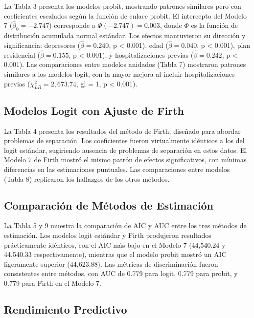 \documentclass[
  spanish,
  10pt,
]{article}
\begin{document}
La Tabla 3 presenta los modelos probit, mostrando patrones similares
pero con coeficientes escalados según la función de enlace probit. El
intercepto del Modelo 7 (\(\hat{\beta}_0 = -2.747\)) corresponde a
\(\Phi(-2.747) = 0.003\), donde \(\Phi\) es la función de distribución
acumulada normal estándar. Los efectos mantuvieron su dirección y
significancia: depresores (\(\hat{\beta} = 0.240\), p \textless{}
0.001), edad (\(\hat{\beta} = 0.040\), p \textless{} 0.001), plan
residencial (\(\hat{\beta} = 0.155\), p \textless{} 0.001), y
hospitalizaciones previas (\(\hat{\beta} = 0.242\), p \textless{}
0.001). Las comparaciones entre modelos anidados (Tabla 7) mostraron
patrones similares a los modelos logit, con la mayor mejora al incluir
hospitalizaciones previas (\(\chi^2_{LR} = 2,673.74\), gl = 1, p
\textless{} 0.001).

\subsection{Modelos Logit con Ajuste de
Firth}\label{modelos-logit-con-ajuste-de-firth}

La Tabla 4 presenta los resultados del método de Firth, diseñado para
abordar problemas de separación. Los coeficientes fueron virtualmente
idénticos a los del logit estándar, sugiriendo ausencia de problemas de
separación en estos datos. El Modelo 7 de Firth mostró el mismo patrón
de efectos significativos, con mínimas diferencias en las estimaciones
puntuales. Las comparaciones entre modelos (Tabla 8) replicaron los
hallazgos de los otros métodos.

\subsection{Comparación de Métodos de
Estimación}\label{comparaciuxf3n-de-muxe9todos-de-estimaciuxf3n}

La Tabla 5 y 9 muestra la comparación de AIC y AUC entre los tres
métodos de estimación. Los modelos logit estándar y Firth produjeron
resultados prácticamente idénticos, con el AIC más bajo en el Modelo 7
(44,540.24 y 44,540.33 respectivamente), mientras que el modelo probit
mostró un AIC ligeramente superior (44,623.88). Las métricas de
discriminación fueron consistentes entre métodos, con AUC de 0.779 para
logit, 0.779 para probit, y 0.779 para Firth en el Modelo 7.

\subsection{Rendimiento Predictivo}\label{rendimiento-predictivo}
\end{document}
